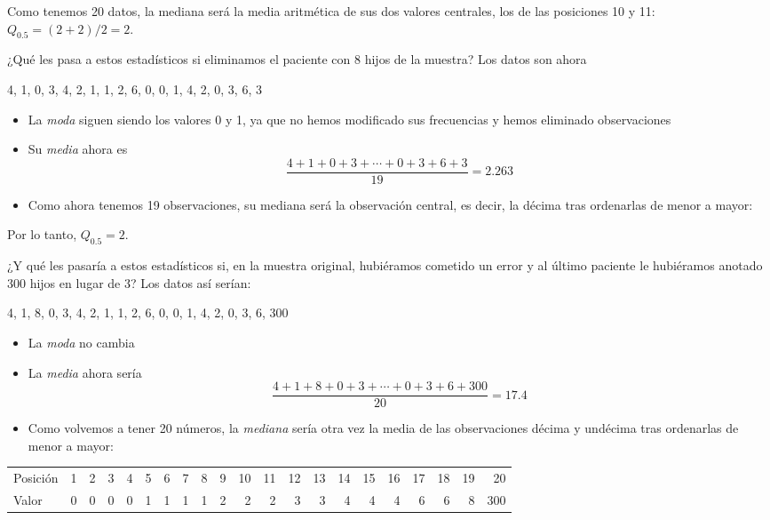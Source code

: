 \documentclass[
  spanish,
  letterpaper,
  DIV=11,
  numbers=noendperiod]{scrreprt}
\begin{document}
Como tenemos 20 datos, la mediana será la media aritmética de sus dos
valores centrales, los de las posiciones 10 y 11: \(Q_{0.5}=(2+2)/2=2\).

¿Qué les pasa a estos estadísticos si eliminamos el paciente con 8 hijos
de la muestra? Los datos son ahora

4, 1, 0, 3, 4, 2, 1, 1, 2, 6, 0, 0, 1, 4, 2, 0, 3, 6, 3

\begin{itemize}
\item
  La \emph{moda} siguen siendo los valores 0 y 1, ya que no hemos
  modificado sus frecuencias y hemos eliminado observaciones
\item
  Su \emph{media} ahora es \[
  \frac{4+1+0+3+\cdots+0+3+6+3}{19}=2.263
  \]
\item
  Como ahora tenemos 19 observaciones, su mediana será la observación
  central, es decir, la décima tras ordenarlas de menor a mayor:
\end{itemize}

Por lo tanto, \(Q_{0.5}=2\).

¿Y qué les pasaría a estos estadísticos si, en la muestra original,
hubiéramos cometido un error y al último paciente le hubiéramos anotado
300 hijos en lugar de 3? Los datos así serían:

4, 1, 8, 0, 3, 4, 2, 1, 1, 2, 6, 0, 0, 1, 4, 2, 0, 3, 6, 300

\begin{itemize}
\item
  La \emph{moda} no cambia
\item
  La \emph{media} ahora sería \[
  \frac{4+1+8+0+3+\cdots+0+3+6+300}{20}=17.4
  \]
\item
  Como volvemos a tener 20 números, la \emph{mediana} sería otra vez la
  media de las observaciones décima y undécima tras ordenarlas de menor
  a mayor:
\end{itemize}

\begin{longtable*}[t]{lrrrrrrrrrrrrrrrrrrrr}
\toprule
 &  &  &  &  &  &  &  &  &  &  &  &  &  &  &  &  &  &  &  & \\
\midrule
Posición & 1 & 2 & 3 & 4 & 5 & 6 & 7 & 8 & 9 & 10 & 11 & 12 & 13 & 14 & 15 & 16 & 17 & 18 & 19 & 20\\
Valor & 0 & 0 & 0 & 0 & 1 & 1 & 1 & 1 & 2 & 2 & 2 & 3 & 3 & 4 & 4 & 4 & 6 & 6 & 8 & 300\\
\bottomrule
\end{longtable*}
\end{document}
